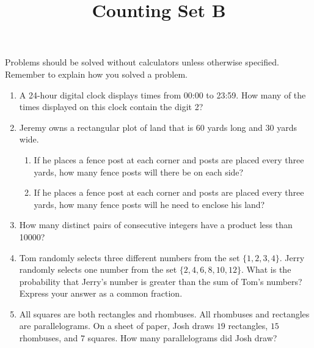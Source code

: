 \documentclass{article}
\title{Counting Set B}
\author{}
\date{}
\begin{document}
\maketitle
\noindent Problems should be solved without calculators unless otherwise 
specified.  Remember to explain how you solved a problem.
\begin{enumerate}
    \item A 24-hour digital clock displays times from 00:00 to 23:59. How 
        many of the times displayed on this clock contain the digit 2?
        \vspace{3cm}
    \item Jeremy owns a rectangular plot of land that is $60$ yards long and 
        $30$ yards wide.
        \begin{enumerate}
            \item If he places a fence post at each corner and posts are placed 
                every three yards, how many fence posts will there be on each 
                side?
                \vspace{3cm}
            \item If he places a fence post at each corner and posts are placed 
                every three yards, how many fence posts will he need to enclose 
                his land?
                \vspace{3cm}
        \end{enumerate}
        \vspace{3cm}
    \item How many distinct pairs of consecutive integers have a product 
        less than \num{10000}?
        \vspace{3cm}
    \item Tom randomly selects three different numbers from the set $\{1, 2, 
        3, 4\}$.  Jerry randomly selects one number from the set $\{2, 4, 6, 
        8 ,10, 12\}$. What is the probability that Jerry's number is greater 
        than the sum of Tom's numbers? Express your answer as a common 
        fraction.
        \vspace{3cm}
    \item All squares are both rectangles and rhombuses. All rhombuses and 
        rectangles are parallelograms. On a sheet of paper, Josh draws $19$ 
        rectangles, $15$ rhombuses, and $7$ squares. How many parallelograms 
        did Josh draw?
        \vspace{3cm}
\end{enumerate}
\end{document}
